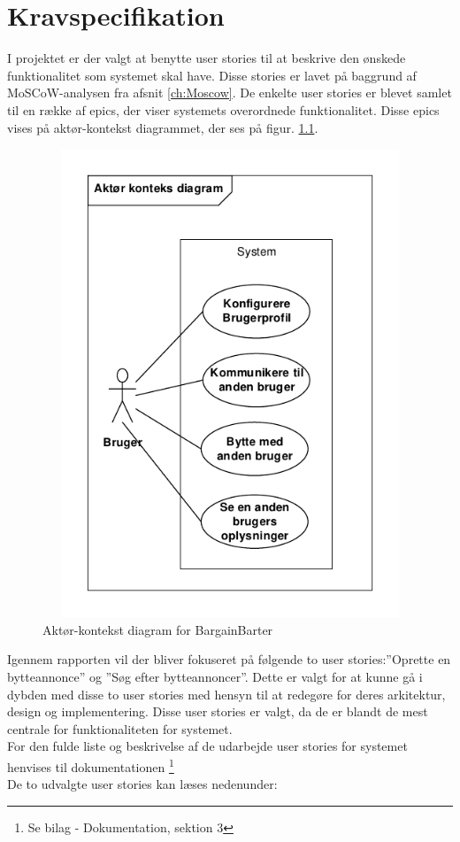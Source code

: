 \chapter{Kravspecifikation}\label{ch:Krav}

I projektet er der valgt at benytte user stories til at beskrive den ønskede funktionalitet som systemet skal have. Disse stories er lavet på baggrund af MoSCoW-analysen fra afsnit \ref{ch:Moscow}.
De enkelte user stories er blevet samlet til en række af epics, der viser systemets overordnede funktionalitet. Disse epics vises på aktør-kontekst diagrammet, der ses på figur. \ref{fig:KontekstDia}. 

\begin{figure}[H]
	\includegraphics[width=140mm,height=140mm]{../Dokumentation/figures/KontekstDiagram.PDF}
	\caption{Aktør-kontekst diagram for BargainBarter}
	\label{fig:KontekstDia}
\end{figure}

\noindent Igennem rapporten vil der bliver fokuseret på følgende to user stories:''Oprette en bytteannonce'' og ''Søg efter bytteannoncer''. Dette er valgt for at kunne gå i dybden med disse to user stories med hensyn til at redegøre for deres arkitektur, design og implementering. Disse user stories er valgt, da de er blandt de mest centrale for funktionaliteten for systemet. \\ For den fulde liste og beskrivelse af de udarbejde user stories for systemet henvises til dokumentationen \footnote{Se bilag - Dokumentation, sektion 3}\\
De to udvalgte user stories kan læses nedenunder:


